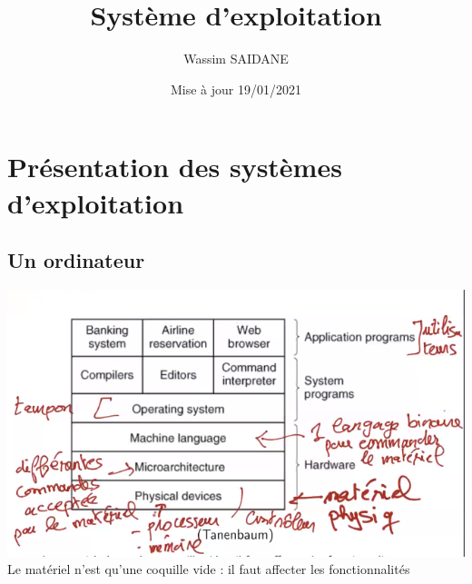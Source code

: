 \documentclass{article}
\title{Système d'exploitation}
\author{Wassim SAIDANE}
\date{Mise à jour 19/01/2021}
\begin{document}
    \maketitle
    \tableofcontents
    \newpage
    \section{Présentation des systèmes d'exploitation}
    \subsection{Un ordinateur}
    \includegraphics{1.PNG}
    Le matériel n'est qu'une coquille vide : il faut affecter les fonctionnalités
\end{document}
